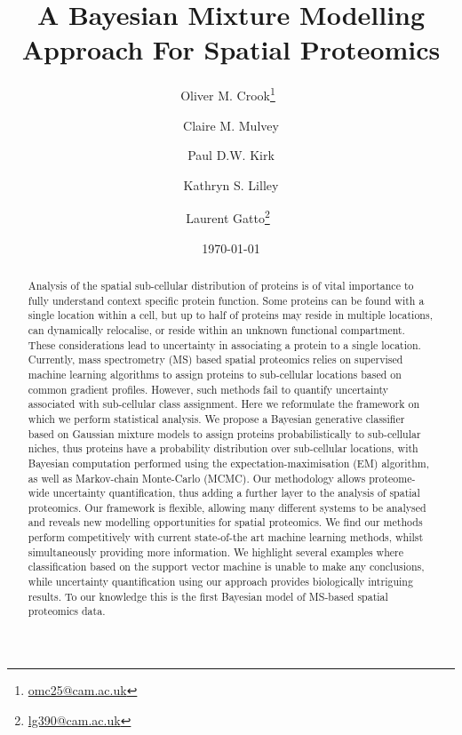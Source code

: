 \documentclass[12pt,english]{article}
\begin{document}


\author[1,2,3]{Oliver M. Crook\thanks{\url{omc25@cam.ac.uk}}~}
\author[2]{Claire M. Mulvey}
\author[3]{Paul D.W. Kirk}
\author[2]{Kathryn S. Lilley}
\author[1,2]{Laurent Gatto\thanks{\url{lg390@cam.ac.uk}}~}





\title{A Bayesian Mixture Modelling Approach For Spatial Proteomics}

\date{\small \today}

\maketitle
\linenumbers
\begin{abstract}
  Analysis of the spatial sub-cellular distribution of proteins is of
  vital importance to fully understand context specific protein
  function. Some proteins can be found with a single location within a
  cell, but up to half of proteins may reside in multiple locations,
  can dynamically relocalise, or reside within an unknown functional
  compartment. These considerations lead to uncertainty in associating
  a protein to a single location. Currently, mass spectrometry (MS)
  based spatial proteomics relies on supervised machine learning
  algorithms to assign proteins to sub-cellular locations based on
  common gradient profiles. However, such methods fail to quantify
  uncertainty associated with sub-cellular class assignment. Here we
  reformulate the framework on which we perform statistical
  analysis. We propose a Bayesian generative classifier based on
  Gaussian mixture models to assign proteins probabilistically to
  sub-cellular niches, thus proteins have a probability distribution
  over sub-cellular locations, with Bayesian computation
  performed using the expectation-maximisation (EM) algorithm, as well
  as Markov-chain Monte-Carlo (MCMC). Our methodology allows
  proteome-wide uncertainty quantification, thus adding a further
  layer to the analysis of spatial proteomics. Our framework is
  flexible, allowing many different systems to be analysed and reveals
  new modelling opportunities for spatial proteomics. We find our
  methods perform competitively with current state-of-the art
  machine learning methods, whilst simultaneously providing more
  information. We highlight several examples where classification
  based on the support vector machine is unable to make any
  conclusions, while uncertainty quantification using our approach provides
  biologically intriguing results.  To our knowledge this is the first
  Bayesian model of MS-based spatial proteomics data.
\end{abstract}
\end{document}
